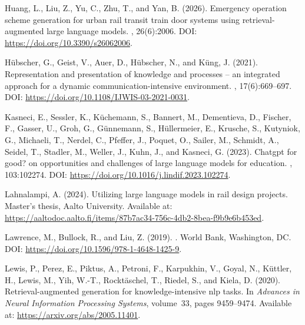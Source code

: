 \documentclass{article}
\begin{document}
\begin{thebibliography}{}
Huang, L., Liu, Z., Yu, C., Zhu, T., and Yan, B. (2026).
\newblock Emergency operation scheme generation for urban rail transit train
  door systems using retrieval-augmented large language models.
, 26(6):2006.
\newblock DOI: \url{https://doi.org/10.3390/s26062006}.

H{\"u}bscher, G., Geist, V., Auer, D., H{\"u}bscher, N., and K{\"u}ng, J.
  (2021).
\newblock Representation and presentation of knowledge and processes -- an
  integrated approach for a dynamic communication-intensive environment.
,
  17(6):669--697.
\newblock DOI: \url{https://doi.org/10.1108/IJWIS-03-2021-0031}.

Kasneci, E., Sessler, K., K{\"u}chemann, S., Bannert, M., Dementieva, D.,
  Fischer, F., Gasser, U., Groh, G., G{\"u}nnemann, S., H{\"u}llermeier, E.,
  Krusche, S., Kutyniok, G., Michaeli, T., Nerdel, C., Pfeffer, J., Poquet, O.,
  Sailer, M., Schmidt, A., Seidel, T., Stadler, M., Weller, J., Kuhn, J., and
  Kasneci, G. (2023).
\newblock Chatgpt for good? on opportunities and challenges of large language
  models for education.
, 103:102274.
\newblock DOI: \url{https://doi.org/10.1016/j.lindif.2023.102274}.

Lahnalampi, A. (2024).
\newblock Utilizing large language models in rail design projects.
\newblock Master's thesis, Aalto University.
\newblock Available at:
  \url{https://aaltodoc.aalto.fi/items/87b7ac34-756c-4db2-8bea-f9b9e6b453ed}.

Lawrence, M., Bullock, R., and Liu, Z. (2019).
.
\newblock World Bank, Washington, DC.
\newblock DOI: \url{https://doi.org/10.1596/978-1-4648-1425-9}.

Lewis, P., Perez, E., Piktus, A., Petroni, F., Karpukhin, V., Goyal, N.,
  K{\"u}ttler, H., Lewis, M., Yih, W.-T., Rockt{\"a}schel, T., Riedel, S., and
  Kiela, D. (2020).
\newblock Retrieval-augmented generation for knowledge-intensive nlp tasks.
\newblock In {\em Advances in Neural Information Processing Systems},
  volume~33, pages 9459--9474.
\newblock Available at: \url{https://arxiv.org/abs/2005.11401}.


\end{thebibliography}
\end{document}

